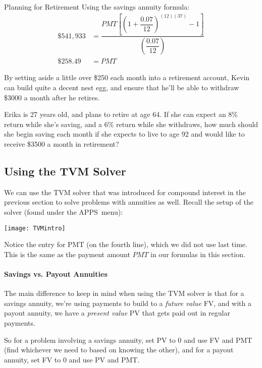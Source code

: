 \begin{example}{Planning for Retirement}
Using the savings annuity formula:
\begin{align*}
\$541,933 &= \dfrac{PMT\left[\left(1+\dfrac{0.07}{12}\right)^{(12)(37)}-1\right]}{\left(\dfrac{0.07}{12}\right)}\\
\boxed{\$258.49} &= PMT
\end{align*}

By setting aside a little over \$250 each month into a retirement account, Kevin can build quite a decent nest egg, and ensure that he'll be able to withdraw \$3000 a month after he retires.
\end{example}

\begin{try}
Erika is 27 years old, and plans to retire at age 64.  If she can expect an 8\% return while she's saving, and a 6\% return while she withdraws, how much should she begin saving each month if she expects to live to age 92 and would like to receive \$3500 a month in retirement?
\end{try}

\vfill
\pagebreak

\subsection{Using the TVM Solver}
We can use the TVM solver that was introduced for compound interest in the previous section to solve problems with annuities as well.  Recall the setup of the solver (found under the $\boxed{\textrm{APPS}}$\ menu):
\begin{center}
\texttt{[image: TVMintro]}
\end{center}

Notice the entry for PMT (on the fourth line), which we did not use last time.  This is the same as the payment amount $PMT$ in our formulas in this section.

\paragraph{Savings vs. Payout Annuities} The main difference to keep in mind when using the TVM solver is that for a savings annuity, we're using payments to build to a \emph{future value} FV, and with a payout annuity, we have a \emph{present value} PV that gets paid out in regular payments.

So for a problem involving a savings annuity, set PV to 0 and use FV and PMT (find whichever we need to based on knowing the other), and for a payout annuity, set FV to 0 and use PV and PMT.\\

